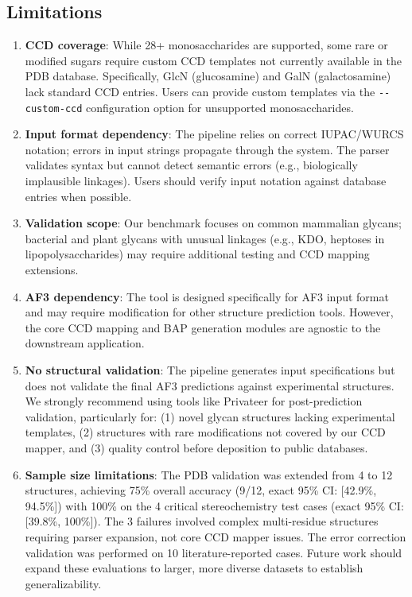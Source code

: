 \documentclass[11pt,a4paper]{article}
\begin{document}
\subsection{Limitations}

\begin{enumerate}
\item \textbf{CCD coverage}: While 28+ monosaccharides are supported, some rare or modified sugars require custom CCD templates not currently available in the PDB database. Specifically, GlcN (glucosamine) and GalN (galactosamine) lack standard CCD entries. Users can provide custom templates via the \texttt{-{}-custom-ccd} configuration option for unsupported monosaccharides.

\item \textbf{Input format dependency}: The pipeline relies on correct IUPAC/WURCS notation; errors in input strings propagate through the system. The parser validates syntax but cannot detect semantic errors (e.g., biologically implausible linkages). Users should verify input notation against database entries when possible.

\item \textbf{Validation scope}: Our benchmark focuses on common mammalian glycans; bacterial and plant glycans with unusual linkages (e.g., KDO, heptoses in lipopolysaccharides) may require additional testing and CCD mapping extensions.

\item \textbf{AF3 dependency}: The tool is designed specifically for AF3 input format and may require modification for other structure prediction tools. However, the core CCD mapping and BAP generation modules are agnostic to the downstream application.

\item \textbf{No structural validation}: The pipeline generates input specifications but does not validate the final AF3 predictions against experimental structures. We strongly recommend using tools like Privateer \citep{agirre2023} for post-prediction validation, particularly for: (1) novel glycan structures lacking experimental templates, (2) structures with rare modifications not covered by our CCD mapper, and (3) quality control before deposition to public databases.

\item \textbf{Sample size limitations}: The PDB validation was extended from 4 to 12 structures, achieving 75\% overall accuracy (9/12, exact 95\% CI: [42.9\%, 94.5\%]) with 100\% on the 4 critical stereochemistry test cases (exact 95\% CI: [39.8\%, 100\%]). The 3 failures involved complex multi-residue structures requiring parser expansion, not core CCD mapper issues. The error correction validation was performed on 10 literature-reported cases. Future work should expand these evaluations to larger, more diverse datasets to establish generalizability.


\end{enumerate}
\end{document}
